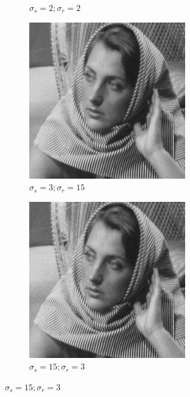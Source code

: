 \documentclass[12pt]{article}
\begin{document}
\begin{figure}[h]
\begin{subfigure}[b]{0.24\textwidth}
        \caption{$\sigma_s=2;\sigma_r=2$}
        \label{fig:subfig2}
    \end{subfigure}
    \begin{subfigure}[b]{0.24\textwidth}
        \centering
        \includegraphics[width=\textwidth]{../images/filtered_barbara256_bilateral_sigma_s_3_sigma_r_15.png}
        \caption{$\sigma_s=3;\sigma_r=15$}
        \label{fig:subfig3}
    \end{subfigure}
    \begin{subfigure}[b]{0.24\textwidth}
        \centering
        \includegraphics[width=\textwidth]{../images/filtered_barbara256_bilateral_sigma_s_15_sigma_r_3.png}
        \caption{$\sigma_s=15;\sigma_r=3$}
        \label{fig:subfig3}
    \end{subfigure}
    

\end{figure}
\end{document}
